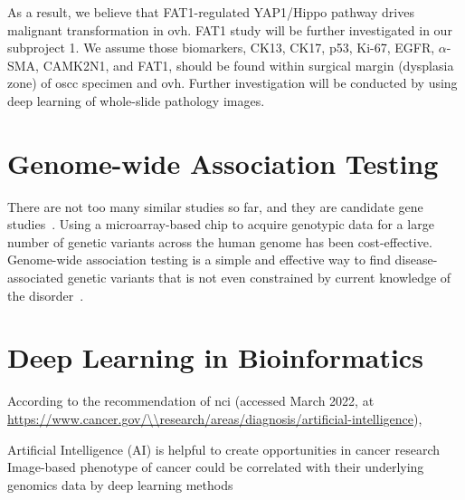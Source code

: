 \documentclass[12pt, a4paper]{article}
\begin{document}
As a result, we believe that FAT1-regulated YAP1/Hippo pathway drives malignant transformation in \acrshort{ovh}. FAT1 study will be further investigated in our subproject 1.
We assume those biomarkers, CK13, CK17, p53, Ki-67, EGFR, $\alpha$-SMA, CAMK2N1, and FAT1, should be found within surgical margin (dysplasia zone) of \acrshort{oscc} specimen and \acrshort{ovh}.
Further investigation will be conducted by using deep learning of whole-slide pathology images.





\clearpage

\section{Genome-wide Association Testing}
There are not too many similar studies so far, and they are candidate gene studies~\cite{Shridhar2016, Huang2019a, Chung2019}.
Using a microarray-based chip to acquire genotypic data for a large number of genetic variants across the human genome has been cost-effective. Genome-wide association testing is a simple and effective way to find disease-associated genetic variants that is not even constrained by current knowledge of the disorder~\citep{Hosking2011}.


\section{Deep Learning in Bioinformatics}

According to the recommendation of \acrfull{nci} (accessed March 2022, at \url{https://www.cancer.gov/\\research/areas/diagnosis/artificial-intelligence}), 
\begin{outline}
\1 Artificial Intelligence (AI) is helpful to create opportunities in cancer research
\1 Image-based phenotype of cancer could be correlated with their underlying genomics data by deep learning methods
\end{outline}
\end{document}
